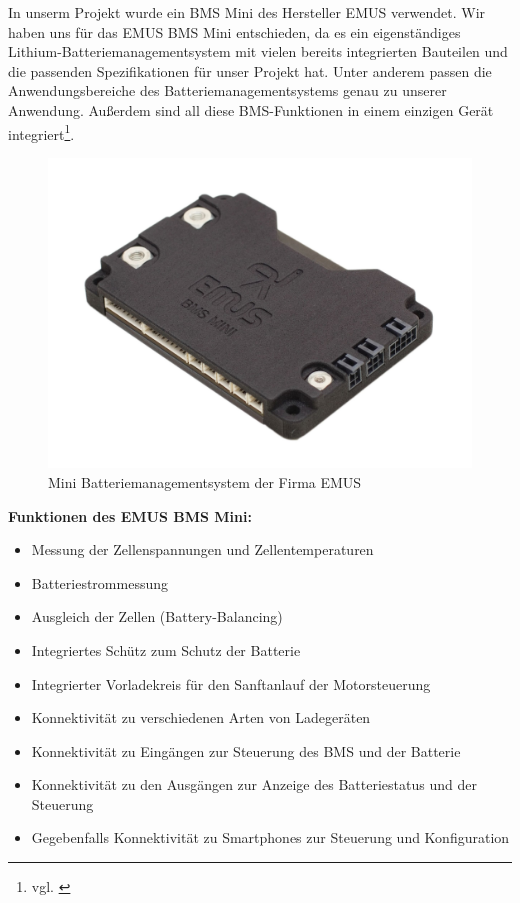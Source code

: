 In unserm Projekt wurde ein BMS Mini des Hersteller EMUS verwendet. Wir haben uns für das EMUS BMS Mini entschieden, da es ein eigenständiges Lithium-Batteriemanagementsystem mit vielen bereits integrierten Bauteilen und die passenden Spezifikationen für unser Projekt hat. Unter anderem passen die Anwendungsbereiche des Batteriemanagementsystems genau zu unserer Anwendung. Außerdem sind all diese BMS-Funktionen in einem einzigen Gerät integriert\footnote{vgl. \cite{BmSFkt}}.

\begin{figure}[H]
	\begin{center}
		\includegraphics[scale=0.15]{figures/Akku/BMSMINI.jpg}
		\caption{Mini Batteriemanagementsystem der Firma EMUS\cite{EmusBmsMini}}
		\label{fig: Mini Batteriemanagementsystem der Firma EMUS}
	\end{center}
\end{figure}

\textbf{Funktionen des EMUS BMS Mini:}
\begin{itemize}
\item {Messung der Zellenspannungen und Zellentemperaturen} 
\item {Batteriestrommessung}
\item {Ausgleich der Zellen (Battery-Balancing)}
\item {Integriertes Schütz zum Schutz der Batterie}
\item {Integrierter Vorladekreis für den Sanftanlauf der Motorsteuerung}
\item {Konnektivität zu verschiedenen Arten von Ladegeräten}
\item {Konnektivität zu Eingängen zur Steuerung des BMS und der Batterie}
\item {Konnektivität zu den Ausgängen zur Anzeige des Batteriestatus und der Steuerung}
\item {Gegebenfalls Konnektivität zu Smartphones zur Steuerung und Konfiguration}
\end{itemize}

